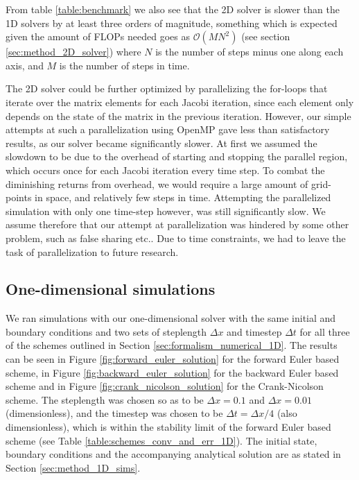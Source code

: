 \documentclass[reprint,english,notitlepage]{revtex4-1}  %
\begin{document}
From table \ref{table:benchmark} we also see that the 2D solver is slower than the 1D solvers by at least three orders of magnitude, something which is expected given the amount of FLOPs needed goes as \(\mathcal{O}(MN^{2})\) (see section \ref{sec:method_2D_solver}) where \(N\) is the number of steps minus one along each axis, and \(M\) is the number of steps in time.

The 2D solver could be further optimized by parallelizing the for-loops that iterate over the matrix elements for each Jacobi iteration, since each element only depends on the state of the matrix in the previous iteration. However, our simple attempts at such a parallelization using OpenMP gave less than satisfactory results, as our solver became significantly slower. At first we assumed the slowdown to be due to the overhead of starting and stopping the parallel region, which occurs once for each Jacobi iteration every time step. To combat the diminishing returns from overhead, we would require a large amount of grid-points in space, and relatively few steps in time. Attempting the parallelized simulation with only one time-step however, was still significantly slow. We assume therefore that our attempt at parallelization was hindered by some other problem, such as false sharing etc.. Due to time constraints, we had to leave the task of parallelization to future research. 

\subsection{One-dimensional simulations} \label{sec:discussion_1D}

We ran simulations with our one-dimensional solver with the same initial and boundary conditions and two sets of steplength $\Delta x$ and timestep $\Delta t$ for all three of the schemes outlined in Section \ref{sec:formalism_numerical_1D}. The results can be seen in Figure \ref{fig:forward_euler_solution} for the forward Euler based scheme, in Figure \ref{fig:backward_euler_solution} for the backward Euler based scheme and in Figure \ref{fig:crank_nicolson_solution} for the Crank-Nicolson scheme. The steplength was chosen so as to be $\Delta x = 0.1$ and $\Delta x = 0.01$ (dimensionless), and the timestep was chosen to be $\Delta t = \Delta x/4$ (also dimensionless), which is within the stability limit of the forward Euler based scheme (see Table \ref{table:schemes_conv_and_err_1D}). The initial state, boundary conditions and the accompanying analytical solution are as stated in Section \ref{sec:method_1D_sims}.
\end{document}
